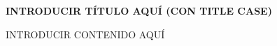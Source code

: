 \documentclass[11pt]{article} %
\newcommand{\thetitle}{INTRODUCIR TÍTULO AQUÍ (con Title Case)}
\begin{document}
\begin{center}
  \bf \LARGE
  \MakeUppercase{\thetitle}
\end{center}

INTRODUCIR CONTENIDO AQUÍ
\end{document}
